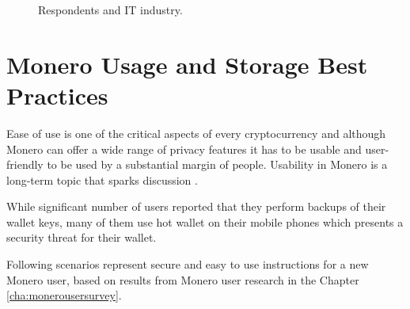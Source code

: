 \documentclass[
  printed, %
  table,   %
  lof,     %
  lot,     %
           oneside, color
]{fithesis3}
\begin{document}
\begin{center}
\begin{figure}[H]
\caption{Respondents and IT industry.}
\label{chart:itindustryuserresearch}\end{figure}\end{center}

\chapter{Monero Usage and Storage Best Practices}
Ease of use is one of the critical aspects of every cryptocurrency and although Monero can offer a wide range of privacy features it has to be usable and user-friendly to be used by a substantial margin of people. Usability in Monero is a long-term topic that sparks discussion \cite{monerolang2018}.

While significant number of users reported that they perform backups of their wallet keys, many of them use hot wallet on their mobile phones which presents a security threat for their wallet.

Following scenarios represent secure and easy to use instructions for a new Monero user, based on results from Monero user research in the Chapter \ref{cha:monerousersurvey}.
\vspace{-1em}
\end{document}

